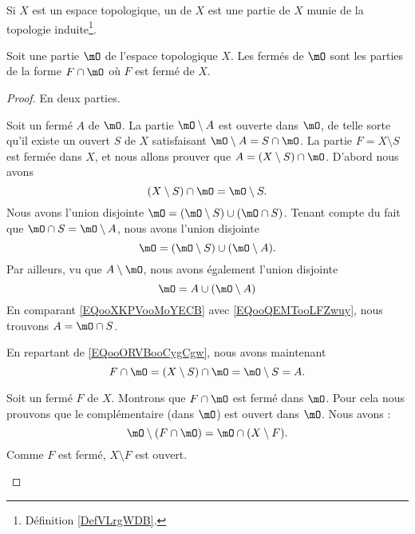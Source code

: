 \begin{definition}	\label{DEFooEXHFooKlKcQD}
	Si \( X\) est un espace topologique, un  de \( X\) est une partie de \( X\) munie de la topologie induite\footnote{Définition \ref{DefVLrgWDB}.}.
\end{definition}



\begin{proposition}	\label{PROPooQFIMooYmgjhA}
	Soit une partie \( \mO\) de l'espace topologique \( X\). Les fermés de \( \mO\) sont les parties de la forme \( F\cap \mO\) où \( F\) est fermé de \( X\).
\end{proposition}

\begin{proof}
	En deux parties.
	\begin{subproof}
		Soit un fermé \( A\) de \( \mO\). La partie \( \mO\setminus A\) est ouverte dans \( \mO\), de telle sorte qu'il existe un ouvert \( S\) de \( X\) satisfaisant \( \mO\setminus A=S\cap \mO\). La partie \( F=X\setminus S\) est fermée dans \( X\), et nous allons prouver que \( A=(X\setminus S)\cap \mO\). D'abord nous avons
		\begin{equation}		\label{EQooORVBooCygCgw}
			(X\setminus S)\cap\mO=\mO\setminus S.
		\end{equation}
		Nous avons l'union disjointe \( \mO=(\mO\setminus S)\cup (\mO\cap S)\). Tenant compte du fait que \( \mO\cap S=\mO\setminus A\), nous avons l'union disjointe
		\begin{equation}	\label{EQooXKPVooMoYECB}
			\mO=(\mO\setminus S)\cup (\mO\setminus A).
		\end{equation}
		Par ailleurs, vu que \( A\setminus \mO\), nous avons également l'union disjointe
		\begin{equation}	\label{EQooQEMTooLFZwuy}
			\mO=A\cup (\mO\setminus A)
		\end{equation}
		En comparant \eqref{EQooXKPVooMoYECB} avec \eqref{EQooQEMTooLFZwuy}, nous trouvons \( A=\mO\cap S\).

		En repartant de \eqref{EQooORVBooCygCgw}, nous avons maintenant
		\begin{equation}
			F\cap \mO=(X\setminus S)\cap \mO=\mO\setminus S=A.
		\end{equation}

		Soit un fermé \( F\) de \( X\). Montrons que \( F\cap\mO\) est fermé dans \( \mO\). Pour cela nous prouvons que le complémentaire (dans \( \mO\)) est ouvert dans \( \mO\). Nous avons :
		\begin{equation}
			\mO\setminus(F\cap\mO)=\mO\cap(X\setminus F).
		\end{equation}
		Comme \( F\) est fermé, \( X\setminus F\) est ouvert.
	\end{subproof}
\end{proof}


